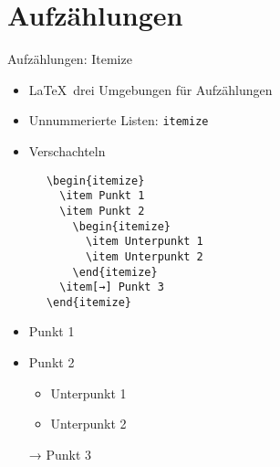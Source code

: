 \section{Aufzählungen}

\begin{frame}[fragile]{Aufzählungen: Itemize}
  \begin{itemize}
    \item \LaTeX\ drei Umgebungen für Aufzählungen
    \item Unnummerierte Listen: \texttt{itemize}
    \item Verschachteln
  \end{itemize}
  \begin{CodeExample}{0.48}
    \begin{lstlisting}
      \begin{itemize}
        \item Punkt 1
        \item Punkt 2
          \begin{itemize}
            \item Unterpunkt 1
            \item Unterpunkt 2
          \end{itemize}
        \item[→] Punkt 3
      \end{itemize}
    \end{lstlisting}
  \CodeResult
    \begin{itemize}
      \item Punkt 1
      \item Punkt 2
        \begin{itemize}
          \item Unterpunkt 1
          \item Unterpunkt 2
        \end{itemize}
      \item[→] Punkt 3
    \end{itemize}
  \end{CodeExample}
\end{frame}

